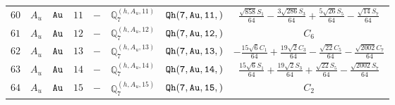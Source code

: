 \documentclass[fleqn,8pt]{jsarticle}
\begin{document}
\begin{table}[ht!]
\begin{center}
\begin{tabular}{cccccccc}
$ 60 $ & $ A_{u} $ & $ {\tt Au} $ & $ 11 $ & $ - $ & $ \mathbb{Q}_{7}^{(h,A_{u},11)} $ & $ {\tt Qh(7,Au,11,)} $ & $ \frac{\sqrt{858} S_{1}}{64} - \frac{3 \sqrt{286} S_{3}}{64} + \frac{5 \sqrt{26} S_{5}}{64} - \frac{\sqrt{14} S_{7}}{64} $ \\
$ 61 $ & $ A_{u} $ & $ {\tt Au} $ & $ 12 $ & $ - $ & $ \mathbb{Q}_{7}^{(h,A_{u},12)} $ & $ {\tt Qh(7,Au,12,)} $ & $ C_{6} $ \\
$ 62 $ & $ A_{u} $ & $ {\tt Au} $ & $ 13 $ & $ - $ & $ \mathbb{Q}_{7}^{(h,A_{u},13)} $ & $ {\tt Qh(7,Au,13,)} $ & $ - \frac{15 \sqrt{6} C_{1}}{64} + \frac{19 \sqrt{2} C_{3}}{64} - \frac{\sqrt{22} C_{5}}{64} - \frac{\sqrt{2002} C_{7}}{64} $ \\
$ 63 $ & $ A_{u} $ & $ {\tt Au} $ & $ 14 $ & $ - $ & $ \mathbb{Q}_{7}^{(h,A_{u},14)} $ & $ {\tt Qh(7,Au,14,)} $ & $ \frac{15 \sqrt{6} S_{1}}{64} + \frac{19 \sqrt{2} S_{3}}{64} + \frac{\sqrt{22} S_{5}}{64} - \frac{\sqrt{2002} S_{7}}{64} $ \\
$ 64 $ & $ A_{u} $ & $ {\tt Au} $ & $ 15 $ & $ - $ & $ \mathbb{Q}_{7}^{(h,A_{u},15)} $ & $ {\tt Qh(7,Au,15,)} $ & $ C_{2} $ \\
 \hline \hline
\end{tabular}
\end{center}
\end{table}
\end{document}
